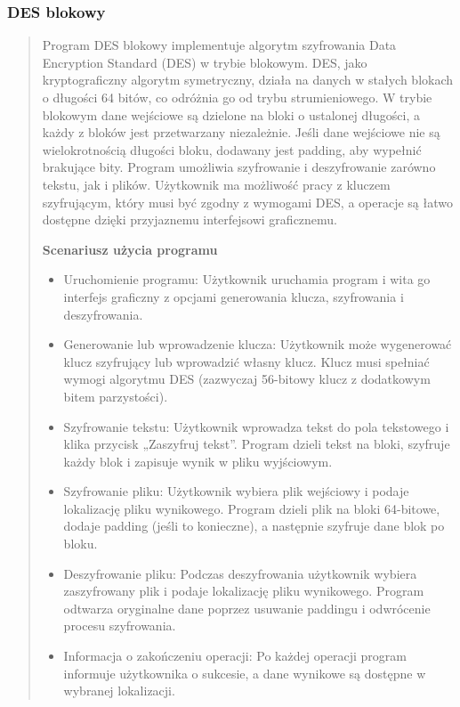 \documentclass[12pt,a4paper]{article}
\begin{document}
\subsubsection{DES blokowy}
\begin{quotation} 
\noindent Program DES blokowy implementuje algorytm szyfrowania Data Encryption Standard (DES) w trybie blokowym. DES, jako kryptograficzny algorytm symetryczny, działa na danych w stałych blokach o długości 64 bitów, co odróżnia go od trybu strumieniowego. W trybie blokowym dane wejściowe są dzielone na bloki o ustalonej długości, a każdy z bloków jest przetwarzany niezależnie. Jeśli dane wejściowe nie są wielokrotnością długości bloku, dodawany jest padding, aby wypełnić brakujące bity. Program umożliwia szyfrowanie i deszyfrowanie zarówno tekstu, jak i plików. Użytkownik ma możliwość pracy z kluczem szyfrującym, który musi być zgodny z wymogami DES, a operacje są łatwo dostępne dzięki przyjaznemu interfejsowi graficznemu.\newline

\noindent\textbf{Scenariusz użycia programu}
\begin{itemize}
\item Uruchomienie programu: Użytkownik uruchamia program i wita go interfejs graficzny z opcjami generowania klucza, szyfrowania i deszyfrowania.
\item Generowanie lub wprowadzenie klucza: Użytkownik może wygenerować klucz szyfrujący lub wprowadzić własny klucz. Klucz musi spełniać wymogi algorytmu DES (zazwyczaj 56-bitowy klucz z dodatkowym bitem parzystości).
\item Szyfrowanie tekstu: Użytkownik wprowadza tekst do pola tekstowego i klika przycisk „Zaszyfruj tekst”. Program dzieli tekst na bloki, szyfruje każdy blok i zapisuje wynik w pliku wyjściowym.
\item Szyfrowanie pliku: Użytkownik wybiera plik wejściowy i podaje lokalizację pliku wynikowego. Program dzieli plik na bloki 64-bitowe, dodaje padding (jeśli to konieczne), a następnie szyfruje dane blok po bloku.
\item Deszyfrowanie pliku: Podczas deszyfrowania użytkownik wybiera zaszyfrowany plik i podaje lokalizację pliku wynikowego. Program odtwarza oryginalne dane poprzez usuwanie paddingu i odwrócenie procesu szyfrowania.
\item Informacja o zakończeniu operacji: Po każdej operacji program informuje użytkownika o sukcesie, a dane wynikowe są dostępne w wybranej lokalizacji.
\end{itemize}
\end{quotation}
\end{document}

